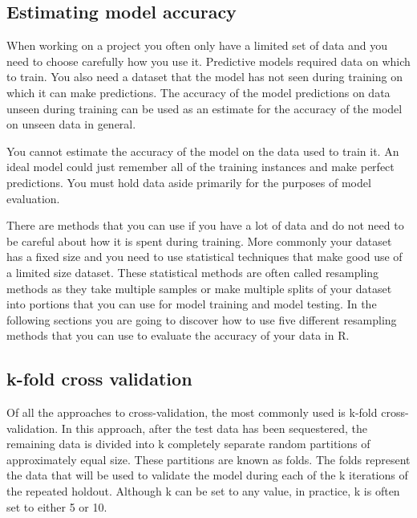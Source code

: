 \documentclass[
]{book}
\begin{document}
\hypertarget{estimating-model-accuracy}{%
\subsection{Estimating model accuracy}\label{estimating-model-accuracy}}

When working on a project you often only have a limited set of data and you need to choose carefully how you use it. Predictive models required data on which to train. You also need a dataset that the model has not seen during training on which it can make predictions. The accuracy of the model predictions on data unseen during training can be used as an estimate for the accuracy of the model on unseen data in general.

You cannot estimate the accuracy of the model on the data used to train it. An ideal model could just remember all of the training instances and make perfect predictions. You must hold data aside primarily for the purposes of model evaluation.

There are methods that you can use if you have a lot of data and do not need to be careful about how it is spent during training. More commonly your dataset has a fixed size and you need to use statistical techniques that make good use of a limited size dataset. These statistical methods are often called resampling methods as they take multiple samples or make multiple splits of your dataset into portions that you can use for model training and model testing. In the following sections you are going to discover how to use five different resampling methods
that you can use to evaluate the accuracy of your data in R.

\hypertarget{k-fold-cross-validation}{%
\subsection{k-fold cross validation}\label{k-fold-cross-validation}}

Of all the approaches to cross-validation, the most commonly used is k-fold cross-validation. In this approach, after the test data has been sequestered, the remaining data is divided into k completely separate random partitions of approximately equal size. These partitions are known as folds. The folds represent the data that will be used to validate the model during each of the k iterations of the repeated holdout. Although k can be set to any value, in practice, k is often set to either 5 or 10.
\end{document}
